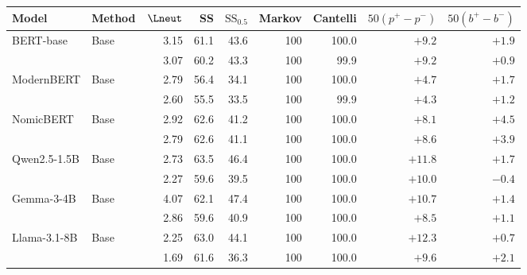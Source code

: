   \footnotesize\setlength{\tabcolsep}{4pt}
  \begin{tabular}{@{}llrrrrrrr@{}}
    \toprule
    Model & Method & $\Lneut$ & SS & $\mathrm{SS}_{0.5}$ & Markov & Cantelli & $50(p^{+}-p^{-})$ & $50(b^{+}-b^{-})$ \\
    \midrule
    BERT-base & Base & 3.15 & 61.1 & 43.6 & 100 & 100.0 & $+9.2$ & $+1.9$ \\
     & \PEAT{} & 3.07 & 60.2 & 43.3 & 100 & 99.9 & $+9.2$ & $+0.9$ \\
    ModernBERT & Base & 2.79 & 56.4 & 34.1 & 100 & 100.0 & $+4.7$ & $+1.7$ \\
     & \PEAT{} & 2.60 & 55.5 & 33.5 & 100 & 99.9 & $+4.3$ & $+1.2$ \\
    NomicBERT & Base & 2.92 & 62.6 & 41.2 & 100 & 100.0 & $+8.1$ & $+4.5$ \\
     & \PEAT{} & 2.79 & 62.6 & 41.1 & 100 & 100.0 & $+8.6$ & $+3.9$ \\
    Qwen2.5-1.5B & Base & 2.73 & 63.5 & 46.4 & 100 & 100.0 & $+11.8$ & $+1.7$ \\
     & \PEAT{} & 2.27 & 59.6 & 39.5 & 100 & 100.0 & $+10.0$ & $-0.4$ \\
    Gemma-3-4B & Base & 4.07 & 62.1 & 47.4 & 100 & 100.0 & $+10.7$ & $+1.4$ \\
     & \PEAT{} & 2.86 & 59.6 & 40.9 & 100 & 100.0 & $+8.5$ & $+1.1$ \\
    Llama-3.1-8B & Base & 2.25 & 63.0 & 44.1 & 100 & 100.0 & $+12.3$ & $+0.7$ \\
     & \PEAT{} & 1.69 & 61.6 & 36.3 & 100 & 100.0 & $+9.6$ & $+2.1$ \\
    \bottomrule
  \end{tabular}

